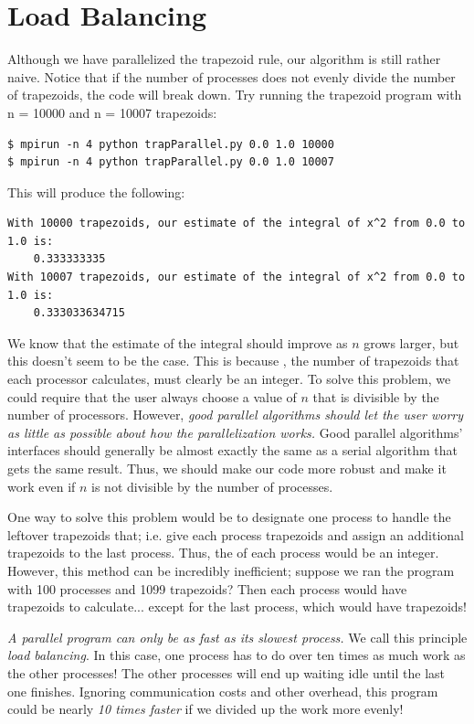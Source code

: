 \section*{Load Balancing}
Although we have parallelized the trapezoid rule, our algorithm is still rather
naive. Notice that if the number of processes does not evenly divide the number
of trapezoids, the code will break down. Try running the trapezoid program with
n = 10000 and n = 10007 trapezoids:
\begin{lstlisting}[style=ShellInput]
$ mpirun -n 4 python trapParallel.py 0.0 1.0 10000
$ mpirun -n 4 python trapParallel.py 0.0 1.0 10007
\end{lstlisting}
This will produce the following:
\begin{lstlisting}[style=ShellOutput]
With 10000 trapezoids, our estimate of the integral of x^2 from 0.0 to 1.0 is:
    0.333333335
With 10007 trapezoids, our estimate of the integral of x^2 from 0.0 to 1.0 is:
    0.333033634715
\end{lstlisting}

We know that the estimate of the integral should improve as $n$ grows larger,
but this doesn't seem to be the case. This is because , the number
of trapezoids that each processor calculates, must clearly be an integer. To
solve this problem, we could require that the user always choose a value of $n$
that is divisible by the number of processors. However, \emph{good parallel
algorithms should let the user worry as little as possible about how the
parallelization works.} Good parallel algorithms' interfaces should generally be
almost exactly the same as a serial algorithm that gets the same result. Thus,
we should make our code more robust and make it work even if $n$ is not
divisible by the number of processes.

One way to solve this problem would be to designate one process to handle the
leftover trapezoids that; i.e. give each process  trapezoids and
assign an additional  trapezoids to the last process. Thus, the
 of each process would be an integer. However, this method can be
incredibly inefficient; suppose we ran the program with 100 processes and 1099
trapezoids? Then each process would have  trapezoids to
calculate... except for the last process, which would have  trapezoids!

\emph{A parallel program can only be as fast as its slowest process.} We call
this principle \emph{load balancing}. In this case, one process has to do over
ten times as much work as the other processes! The other processes will end up
waiting idle until the last one finishes. Ignoring communication costs and other
overhead, this program could be nearly \emph{10 times faster} if we divided up the work
more evenly!

